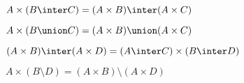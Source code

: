 \begin{exercise}
    $A \times (B \inter C) = (A \times B) \inter (A \times C)$
\end{exercise}

\begin{exercise}
    $A \times (B \union C) = (A \times B) \union (A \times C)$
\end{exercise}

\begin{exercise}
    $(A \times B) \inter (A \times D) = (A \inter C) \times (B \inter D)$
\end{exercise}

\begin{exercise}
    $A \times (B \setminus D) = (A \times B) \setminus (A \times D)$
\end{exercise}
